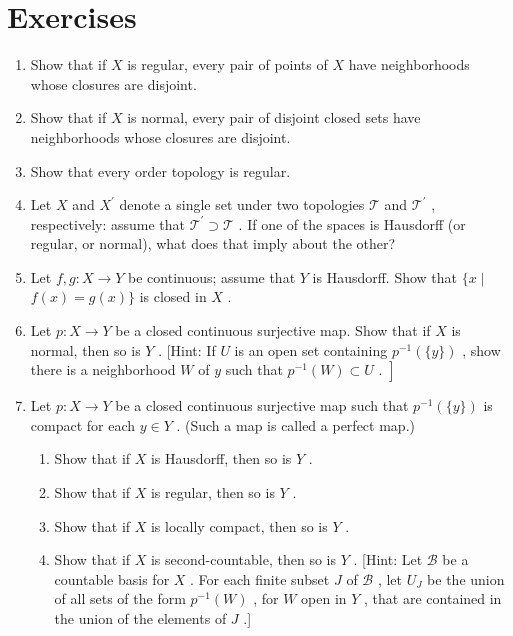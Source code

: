 \section*{Exercises}
\begin{enumerate}[itemsep=0.4em, parsep=0pt, topsep=0pt, partopsep=0pt, leftmargin=*, label=\arabic*., ref=\arabic*]
\item Show that if \(X\) is regular, every pair of points of \(X\) have neighborhoods whose closures are disjoint.
\item Show that if \(X\) is normal, every pair of disjoint closed sets have neighborhoods whose closures are disjoint.
\item Show that every order topology is regular.
\item Let \(X\) and \({X}^{\prime }\) denote a single set under two topologies \(\mathcal{T}\) and \({\mathcal{T}}^{\prime }\) , respectively: assume that \({\mathcal{T}}^{\prime } \supset  \mathcal{T}\) . If one of the spaces is Hausdorff (or regular, or normal), what does that imply about the other?
\item Let \(f,g : X \rightarrow  Y\) be continuous; assume that \(Y\) is Hausdorff. Show that \(\{ x \mid\)  \(f\left( x\right)  = g\left( x\right) \}\) is closed in \(X\) .
\item Let \(p : X \rightarrow  Y\) be a closed continuous surjective map. Show that if \(X\) is normal, then so is \(Y\) . [Hint: If \(U\) is an open set containing \({p}^{-1}\left( {\{ y\} }\right)\) , show there is a neighborhood \(W\) of \(y\) such that \(\left. {{p}^{-1}\left( W\right)  \subset  U\text{ . }}\right\rbrack\)
\item Let \(p : X \rightarrow  Y\) be a closed continuous surjective map such that \({p}^{-1}\left( {\{ y\} }\right)\) is compact for each \(y \in  Y\) . (Such a map is called a perfect map.)
  \begin{enumerate}[itemsep=0.2em, parsep=0pt, topsep=0pt, partopsep=0pt, leftmargin=*, label=(\alph*), align=left]
  \item Show that if \(X\) is Hausdorff, then so is \(Y\) .
  \item Show that if \(X\) is regular, then so is \(Y\) .
  \item Show that if \(X\) is  locally compact, then so is \(Y\) .
  \item Show that if \(X\) is second-countable, then so is \(Y\) . [Hint: Let \(\mathcal{B}\) be a countable basis for \(X\) . For each finite subset \(J\) of \(\mathcal{B}\) , let \({U}_{J}\) be the union of all sets of the form \({p}^{-1}\left( W\right)\) , for \(W\) open in \(Y\) , that are contained in the union of the elements of \(J\) .]

\end{enumerate}
\end{enumerate}
